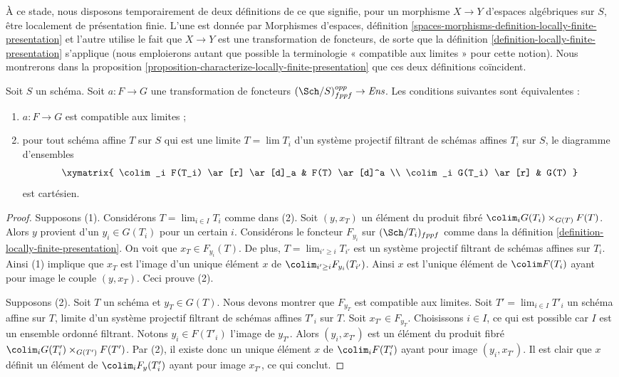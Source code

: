 \medskip\noindent
À ce stade, nous disposons temporairement de deux définitions de ce que signifie,
pour un morphisme $X \to Y$ d'espaces algébriques sur $S$, être localement de présentation
finie. L'une est donnée par
Morphismes d'espaces,
définition \ref{spaces-morphisms-definition-locally-finite-presentation}
et l'autre utilise le fait que $X \to Y$ est une transformation de foncteurs, de sorte que
la définition \ref{definition-locally-finite-presentation}
s'applique (nous emploierons autant que possible la terminologie « compatible aux limites »
pour cette notion). Nous montrerons dans
la proposition \ref{proposition-characterize-locally-finite-presentation}
que ces deux définitions coïncident.

\begin{lemma}
\label{lemma-characterize-relative-limit-preserving}
Soit $S$ un schéma. Soit $a : F \to G$ une transformation de foncteurs
$(\Sch/S)_{fppf}^{opp} \to \textit{Ens}$.
Les conditions suivantes sont équivalentes :
\begin{enumerate}
\item $a : F \to G$ est compatible aux limites ;
\item pour tout schéma affine $T$ sur $S$ qui est une
limite $T = \lim T_i$ d'un système projectif filtrant de
schémas affines $T_i$ sur $S$, le diagramme d'ensembles
$$
\xymatrix{
\colim_i F(T_i) \ar[r] \ar[d]_a & F(T) \ar[d]^a \\
\colim_i G(T_i) \ar[r] & G(T)
}
$$
est cartésien.
\end{enumerate}
\end{lemma}

\begin{proof}
Supposons (1). Considérons $T = \lim_{i \in I} T_i$ comme dans (2). Soit
$(y, x_T)$ un élément du produit fibré
$\colim_i G(T_i) \times_{G(T)} F(T)$.
Alors $y$ provient d'un $y_i \in G(T_i)$ pour un certain $i$.
Considérons le foncteur $F_{y_i}$ sur $(\Sch/T_i)_{fppf}$ comme dans
la définition \ref{definition-locally-finite-presentation}.
On voit que $x_T \in F_{y_i}(T)$. De plus, $T = \lim_{i' \geq i} T_{i'}$
est un système projectif filtrant de schémas affines sur $T_i$. Ainsi (1) implique
que $x_T$ est l'image d'un unique élément $x$ de
$\colim_{i' \geq i} F_{y_i}(T_{i'})$. Ainsi $x$ est l'unique
élément de $\colim F(T_i)$ ayant pour image le couple $(y, x_T)$.
Ceci prouve (2).

\medskip\noindent
Supposons (2). Soit $T$ un schéma et $y_T \in G(T)$. Nous devons montrer que
$F_{y_T}$ est compatible aux limites. Soit $T' = \lim_{i \in I} T'_i$ un
schéma affine sur $T$, limite d'un système projectif filtrant de schémas affines $T'_i$
sur $T$. Soit $x_{T'} \in F_{y_T}$. Choisissons $i \in I$, ce qui est possible car
$I$ est un ensemble ordonné filtrant. Notons $y_i \in F(T'_i)$ l'image
de $y_{T'}$. Alors $(y_i, x_{T'})$ est un
élément du produit fibré
$\colim_i G(T'_i) \times_{G(T')} F(T')$.
Par (2), il existe donc un unique élément $x$ de $\colim_i F(T'_i)$
ayant pour image $(y_i, x_{T'})$. Il est clair que $x$ définit un élément
de $\colim_i F_y(T'_i)$ ayant pour image $x_{T'}$, ce qui conclut.
\end{proof}

